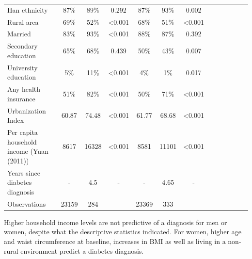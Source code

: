 \begin{landscape}
\begin{table}[p]
\begin{center}
\begin{adjustbox}{max width=\linewidth}
{\begin{tabular}{l*{6}{SS}}
Han ethnicity       &        87\%&      89\%&     0.292       &        87\%&        93\%&     0.002      \\
Rural area          &        69\%&       52\%&     <0.001       &        68\%&        51\%&     <0.001       \\
Married             &        83\%&      93\%&     <0.001       &        88\%&        87\%&    0.392        \\
Secondary education     &        65\%&      68\%&   0.439         &        50\%&        43\%&       0.007     \\
University education    &        5\%&      11\%&    <0.001        &        4\%&        1\%&     0.017      \\
Any health insurance&        51\%&     82\%&     <0.001       &        50\%&        71\%&       <0.001      \\
Urbanization Index  &       60.87&     74.48&     <0.001       &       61.77&       68.68&     <0.001       \\
Per capita household income (Yuan (2011))&    8617&     16328&    <0.001        &     8581&     11101&    <0.001        \\
Years since diabetes diagnosis&       -&        4.5&      -      &        -&        4.65&      -      \\
\midrule
Observations        &       23159&         284&       &        23369&         333&            \\
\bottomrule
\end{tabular}
}
\end{adjustbox}
\end{center}
\end{table}
\end{landscape}
Higher household income levels are not predictive of a diagnosis for men or women, despite what the descriptive statistics indicated. For women, higher age and waist circumference at baseline, increases in \ac{BMI} as well as living in a non-rural environment predict a diabetes diagnosis. 

